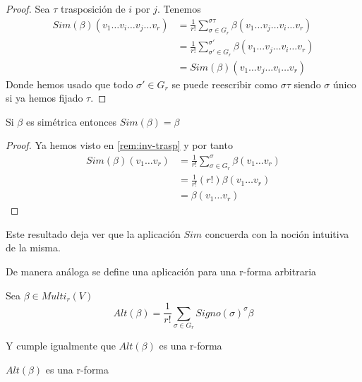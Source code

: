 \documentclass[../VD.tex]{subfiles}
\begin{document}
\begin{proof}
Sea \( \tau \) trasposición de \( i \) por \( j \). Tenemos
\begin{align*}
Sim(\beta)(v_1\ldots v_i\ldots v_j\ldots v_r)&=\frac{1}{r!}\sum_{\sigma\in G_r}^{\sigma\tau}\beta (v_1\ldots v_j\ldots v_i\ldots v_r)\\
&=\frac{1}{r!}\sum_{\sigma'\in G_r}^{\sigma'}\beta(v_1\ldots v_j\ldots v_i\ldots v_r)\\
&=Sim(\beta)(v_1\ldots v_j\ldots v_i\ldots v_r)
\end{align*}
Donde hemos usado que todo \( \sigma'\in G_r \) se puede reescribir como \( \sigma \tau \) siendo \( \sigma \) único si ya hemos fijado \( \tau \).
\end{proof}

\begin{proposition}
Si \( \beta \) es simétrica entonces \( Sim(\beta)=\beta \)
\end{proposition}

\begin{proof}
Ya hemos visto en \ref{rem:inv-trasp} y por tanto
\begin{align*}
Sim(\beta)(v_1\ldots v_r)&=\frac{1}{r!}\sum_{\sigma\in G_r}^\sigma\beta(v_1\ldots v_r)\\
&=\frac{1}{r!}(r!)\beta(v_1\ldots v_r)\\
&=\beta(v_1\ldots v_r)
\end{align*}
\end{proof}

Este resultado deja ver que la aplicación \( Sim \) concuerda con la noción intuitiva de la misma.

De manera análoga se define una aplicación para una r-forma arbitraria
\begin{definition}
Sea \( \beta\in Multi_r(V) \)
\[
Alt(\beta)=\frac{1}{r!}\sum_{\sigma\in G_r}Signo(\sigma) ^\sigma\beta
\]
\end{definition}

Y cumple igualmente  que \( Alt(\beta) \) es una r-forma

\begin{proposition}
\( Alt(\beta) \) es una r-forma
\end{proposition}
\end{document}

